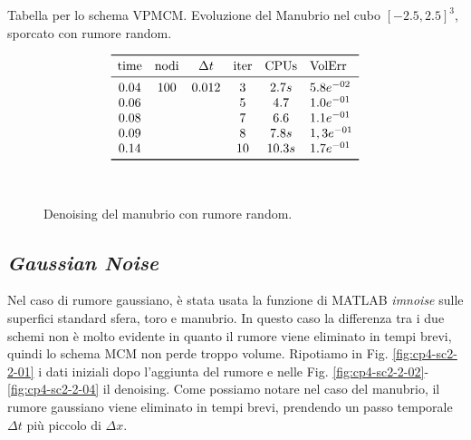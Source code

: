 \begin{table}[htb!]
\caption{Tabella per lo schema VPMCM. Evoluzione del Manubrio nel cubo
  $[-2.5,2.5]^3$, sporcato con rumore random.}
\label{tab:cp4-sc2-1-03}
\[
\begin{array}{*{5}{c}l}
    \toprule
    \text{time} &\text{nodi} &\Delta t &\text{iter} &\text{CPUs}&\text{VolErr} \\
    \midrule
     0.04       & 100        & 0.012   & 3          & 2.7s     &5.8e^{-02}\\
     0.06       &            &         & 5          & 4.7      &1.0e^{-01}\\ 
     0.08       &            &         & 7          & 6.6      &1.1e^{-01}\\ 
     0.09       &            &         & 8          & 7.8s     &1,3e^{-01}\\
     0.14       &            &         & 10         & 10.3s    &1.7e^{-01}\\     
     \bottomrule
\end{array}
\]
\end{table}

\begin{figure}[htb!]
  \centering
  \quad
  \\
  \quad
  \quad
  \caption{Denoising del manubrio con rumore random.}
  \label{fig:cp4-sc2-1-03}
\end{figure}

%
\subsection{\emph{Gaussian Noise}}
Nel caso di rumore gaussiano, è stata usata la funzione di MATLAB
\emph{imnoise} sulle superfici standard sfera, toro e manubrio. In
questo caso la differenza tra i due schemi non è molto evidente in
quanto il rumore viene eliminato in tempi brevi, quindi lo schema MCM
non perde troppo volume. Ripotiamo in Fig. \ref{fig:cp4-sc2-2-01}
i dati iniziali dopo l'aggiunta del rumore e nelle
Fig. \ref{fig:cp4-sc2-2-02}-\ref{fig:cp4-sc2-2-04} il
denoising. Come possiamo notare nel caso del manubrio, il rumore
gaussiano viene eliminato in tempi brevi, prendendo un  passo
temporale $\Delta t$ più piccolo di $\Delta x$.

